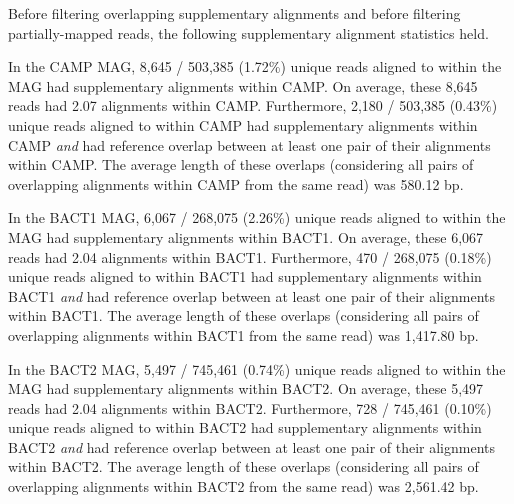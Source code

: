 Before filtering overlapping supplementary alignments and before filtering
partially-mapped reads, the following supplementary alignment statistics held.

In the CAMP MAG, 8,645 / 503,385 (1.72\%) unique reads aligned to within the MAG had supplementary alignments within CAMP.
On average, these 8,645 reads had 2.07 alignments within CAMP.
Furthermore, 2,180 / 503,385 (0.43\%) unique reads aligned to within CAMP had supplementary alignments within CAMP \emph{and} had reference overlap between at least one pair of their alignments within CAMP.
The average length of these overlaps (considering all pairs of overlapping alignments within CAMP from the same read) was 580.12 bp.

In the BACT1 MAG, 6,067 / 268,075 (2.26\%) unique reads aligned to within the MAG had supplementary alignments within BACT1.
On average, these 6,067 reads had 2.04 alignments within BACT1.
Furthermore, 470 / 268,075 (0.18\%) unique reads aligned to within BACT1 had supplementary alignments within BACT1 \emph{and} had reference overlap between at least one pair of their alignments within BACT1.
The average length of these overlaps (considering all pairs of overlapping alignments within BACT1 from the same read) was 1,417.80 bp.

In the BACT2 MAG, 5,497 / 745,461 (0.74\%) unique reads aligned to within the MAG had supplementary alignments within BACT2.
On average, these 5,497 reads had 2.04 alignments within BACT2.
Furthermore, 728 / 745,461 (0.10\%) unique reads aligned to within BACT2 had supplementary alignments within BACT2 \emph{and} had reference overlap between at least one pair of their alignments within BACT2.
The average length of these overlaps (considering all pairs of overlapping alignments within BACT2 from the same read) was 2,561.42 bp.
\endinput
